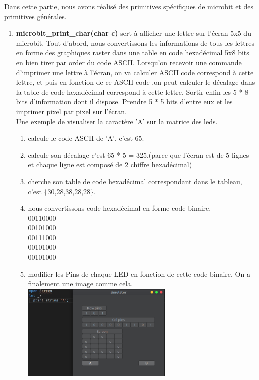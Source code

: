 \documentclass[14px]{article}
\begin{document}
Dans cette partie, nous avons réalisé des primitives spécifiques de microbit et des primitives générales.
\begin{enumerate}
	\item \textbf{microbit\_print\_char(char c)} sert à afficher une lettre sur l'écran 5x5 du microbit. 
	Tout d'abord, nous convertissons les informations de tous les lettres en forme des graphiques raster dans une table en code hexadécimal 5x8 bits en bien tirer par order du code ASCII. Lorsqu'on recevoir une commande d'imprimer une lettre à l'écran,
	on va calculer ASCII code correspond à cette lettre, et puis en fonction de ce ASCII code ,on peut calculer le décalage dans la table de code hexadécimal correspond à cette lettre. Sortir enfin les 5 * 8 bits d'information dont il dispose. Prendre 5 * 5 bits d'entre eux et les imprimer pixel par pixel sur l'écran.\\
	
	Une exemple de visualiser la caractère 'A' sur la matrice des leds.
	\begin{enumerate}
		\item calcule le code ASCII de 'A', c'est 65.
		\item calcule son décalage c'est 65 * 5 = 325.(parce que l'écran est de 5 lignes et chaque ligne est composé de 2 chiffre hexadécimal)
		\item cherche son table de code hexadécimal correspondant dans le tableau, c'est \{30,28,38,28,28\}.
		\item nous convertissons code hexadécimal en forme code binaire.\\
		00110000\\
		00101000\\
		00111000\\
		00101000\\
		00101000
		\item modifier les Pins de chaque LED en fonction de cette code binaire. On a finalement une image comme cela.\\
		\includegraphics[width=0.6\textwidth]{printA.png}\\[1cm]	
	\end{enumerate}
	

\end{enumerate}
\end{document}
